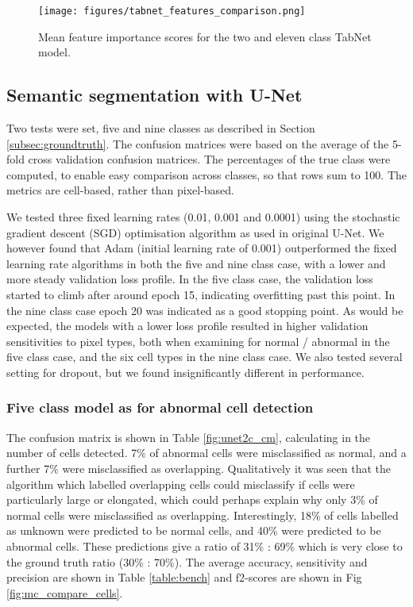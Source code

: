 \documentclass[final,5p,times,twocolumn,authoryear]{elsarticle}
\begin{document}
\begin{figure}[t!]
	\centering
	\texttt{[image: figures/tabnet\_features\_comparison.png]}
	\caption[Mean feature importance scores for the two and eleven class TabNet model]{Mean feature importance scores for the two and eleven class TabNet model.}
	\label{fig:tabnet_f_compare}
\end{figure}




\subsection{Semantic segmentation with U-Net}
\label{sec:semantic_seg}

 Two tests were set, five and nine classes as described in Section \ref{subsec:groundtruth}. The confusion matrices were based on the average of the 5-fold cross validation confusion matrices. The  percentages of the true class were computed, to enable easy comparison across classes, so that rows sum to 100. The metrics are cell-based, rather than pixel-based.



We tested three fixed learning rates (0.01, 0.001 and 0.0001) using the stochastic gradient descent (SGD) optimisation algorithm as used in original U-Net. We however found that Adam (initial learning rate of 0.001) outperformed the fixed learning rate algorithms in both the five and nine class case, with a lower and more steady validation loss profile. 
In the five class case, the validation loss started to climb after around epoch 15, indicating overfitting past this point. In the nine class case epoch 20 was indicated as a good stopping point. As would be expected, the models with a lower loss profile resulted in higher validation sensitivities to pixel types, both when examining for normal / abnormal in the five class case, and the six cell types in the nine class case. We also tested several setting for dropout, but we found insignificantly different in performance. 

\subsubsection{Five class model as for abnormal cell detection}
\label{subsec:5p}

The confusion matrix is shown in Table \ref{fig:unet2c_cm}, calculating in the number of cells detected. 7\% of abnormal cells were misclassified as normal, and a further 7\% were misclassified as overlapping. Qualitatively it was seen that the algorithm which labelled overlapping cells could misclassify if cells were particularly large or elongated, which could perhaps explain why only 3\% of normal cells were misclassified as overlapping. Interestingly, 18\% of cells labelled as unknown were predicted to be normal cells, and 40\% were predicted to be abnormal cells. These predictions give a ratio of 31\% : 69\% which is very close to the ground truth ratio (30\% : 70\%). The average accuracy, sensitivity and precision are shown in Table \ref{table:bench} and f2-scores are shown in Fig \ref{fig:mc_compare_cells}. 
\end{document}

